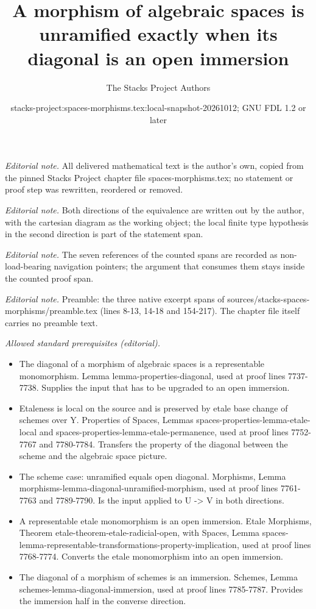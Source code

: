 \documentclass[10pt,a4paper]{amsart}
\title{A morphism of algebraic spaces is unramified exactly when its diagonal is an open immersion}
\author{The Stacks Project Authors}
\date{stacks-project:spaces-morphisms.tex:local-snapshot-20261012; GNU FDL 1.2 or later}
\theoremstyle{plain}
\theoremstyle{definition}
\theoremstyle{remark}
\numberwithin{equation}{subsection}
\begin{document}
\maketitle
\setcounter{subsection}{1}
\noindent\textit{Editorial note.} All delivered mathematical text is the author's own, copied from the pinned Stacks Project chapter file spaces-morphisms.tex; no statement or proof step was rewritten, reordered or removed.\par\medskip
\noindent\textit{Editorial note.} Both directions of the equivalence are written out by the author, with the cartesian diagram as the working object; the local finite type hypothesis in the second direction is part of the statement span.\par\medskip
\noindent\textit{Editorial note.} The seven references of the counted spans are recorded as non-load-bearing navigation pointers; the argument that consumes them stays inside the counted proof span.\par\medskip
\noindent\textit{Editorial note.} Preamble: the three native excerpt spans of sources/stacks-spaces-morphisms/preamble.tex (lines 8-13, 14-18 and 154-217). The chapter file itself carries no preamble text.\par\medskip
\noindent\textit{Allowed standard prerequisites (editorial).}\begin{itemize}
\item The diagonal of a morphism of algebraic spaces is a representable monomorphism. Lemma lemma-properties-diagonal, used at proof lines 7737-7738. Supplies the input that has to be upgraded to an open immersion.
\item Etaleness is local on the source and is preserved by etale base change of schemes over Y. Properties of Spaces, Lemmas spaces-properties-lemma-etale-local and spaces-properties-lemma-etale-permanence, used at proof lines 7752-7767 and 7780-7784. Transfers the property of the diagonal between the scheme and the algebraic space picture.
\item The scheme case: unramified equals open diagonal. Morphisms, Lemma morphisms-lemma-diagonal-unramified-morphism, used at proof lines 7761-7763 and 7789-7790. Is the input applied to U -> V in both directions.
\item A representable etale monomorphism is an open immersion. Etale Morphisms, Theorem etale-theorem-etale-radicial-open, with Spaces, Lemma spaces-lemma-representable-transformations-property-implication, used at proof lines 7768-7774. Converts the etale monomorphism into an open immersion.
\item The diagonal of a morphism of schemes is an immersion. Schemes, Lemma schemes-lemma-diagonal-immersion, used at proof lines 7785-7787. Provides the immersion half in the converse direction.
\end{itemize}\medskip
\end{document}
